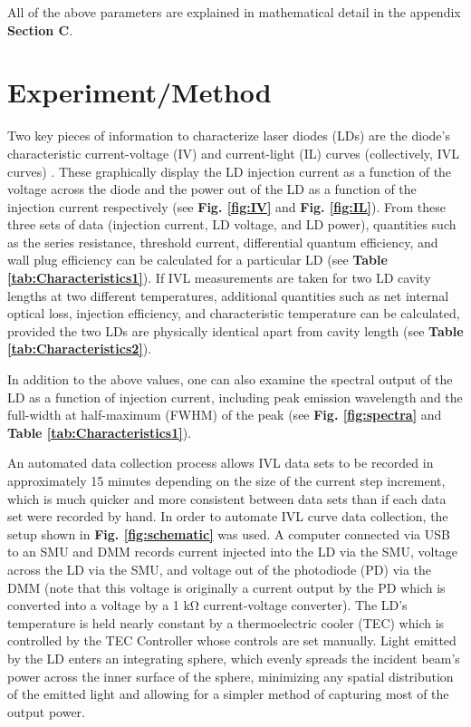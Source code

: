 \documentclass[9pt,twocolumn,twoside]{osajnl}
\begin{document}
All of the above parameters are explained in mathematical detail in the appendix \textbf{Section C}.

\section{Experiment/Method}
\indent \indent Two key pieces of information to characterize laser diodes (LDs) are the diode's characteristic current-voltage (IV) and current-light (IL) curves (collectively, IVL curves) \cite{Coldren}. These graphically display the LD injection current as a function of the voltage across the diode and the power out of the LD as a function of the injection current respectively (see \textbf{Fig. \ref{fig:IV}} and \textbf{Fig. \ref{fig:IL}}). From these three sets of data (injection current, LD voltage, and LD power), quantities such as the series resistance, threshold current, differential quantum efficiency, and wall plug efficiency can be calculated for a particular LD (see \textbf{Table \ref{tab:Characteristics1}}). If IVL measurements are taken for two LD cavity lengths at two different temperatures, additional quantities such as net internal optical loss, injection efficiency, and characteristic temperature can be calculated, provided the two LDs are physically identical apart from cavity length (see \textbf{Table \ref{tab:Characteristics2}}).

In addition to the above values, one can also examine the spectral output of the LD as a function of injection current, including peak emission wavelength and the full-width at half-maximum (FWHM) of the peak (see \textbf{Fig. \ref{fig:spectra}} and \textbf{Table \ref{tab:Characteristics1}}).

An automated data collection process allows IVL data sets to be recorded in approximately 15 minutes depending on the size of the current step increment, which is much quicker and more consistent between data sets than if each data set were recorded by hand. In order to automate IVL curve data collection, the setup shown in \textbf{Fig. \ref{fig:schematic}} was used. A computer connected via USB to an SMU and DMM records current injected into the LD via the SMU, voltage across the LD via the SMU, and voltage out of the photodiode (PD) via the DMM (note that this voltage is originally a current output by the PD which is converted into a voltage by a 1 kΩ current-voltage converter). The LD's temperature is held nearly constant by a thermoelectric cooler (TEC) which is controlled by the TEC Controller whose controls are set manually. Light emitted by the LD enters an integrating sphere, which evenly spreads the incident beam's power across the inner surface of the sphere, minimizing any spatial distribution of the emitted light and allowing for a simpler method of capturing most of the output power.
\end{document}
